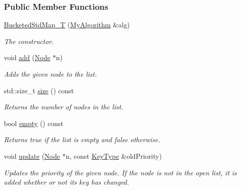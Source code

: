 \subsubsection*{Public Member Functions}
\begin{DoxyCompactItemize}
\item 
\hyperlink{structopenList_1_1BucketedStdMap__T_af33993b0062093ce59664656610e3fd0}{Bucketed\+Std\+Map\+\_\+T} (\hyperlink{structopenList_1_1BucketedStdMap__T_a40b0529a53dfea9e6a9c5c7944ee5b62}{My\+Algorithm} \&alg)
\begin{DoxyCompactList}\small\item\em The constructor. \end{DoxyCompactList}\item 
void \hyperlink{structopenList_1_1BucketedStdMap__T_aa8a26520cb377780b19d2c749b982e64}{add} (\hyperlink{structopenList_1_1BucketedStdMap__T_a54e9b34cd8d421140da4db26b700f5d6}{Node} $\ast$n)
\begin{DoxyCompactList}\small\item\em Adds the given node to the list. \end{DoxyCompactList}\item 
std\+::size\+\_\+t \hyperlink{structopenList_1_1BucketedStdMap__T_a99e8d6c3f4df95ded694b166396acd05}{size} () const 
\begin{DoxyCompactList}\small\item\em Returns the number of nodes in the list. \end{DoxyCompactList}\item 
bool \hyperlink{structopenList_1_1BucketedStdMap__T_ab75cb4f665b8af827008d8ce7bb85f76}{empty} () const 
\begin{DoxyCompactList}\small\item\em Returns {\ttfamily true} if the list is empty and {\ttfamily false} otherwise. \end{DoxyCompactList}\item 
void \hyperlink{structopenList_1_1BucketedStdMap__T_abb78a768e805558ace98c8417f8477b6}{update} (\hyperlink{structopenList_1_1BucketedStdMap__T_a54e9b34cd8d421140da4db26b700f5d6}{Node} $\ast$n, const \hyperlink{structopenList_1_1BucketedStdMap__T_a307af8874eba4b74cfd21f73a335bf0c}{Key\+Type} \&old\+Priority)
\begin{DoxyCompactList}\small\item\em Updates the priority of the given node. If the node is not in the open list, it is added whether or not it\textquotesingle{}s key has changed. \end{DoxyCompactList}\item 

\end{DoxyCompactItemize}
